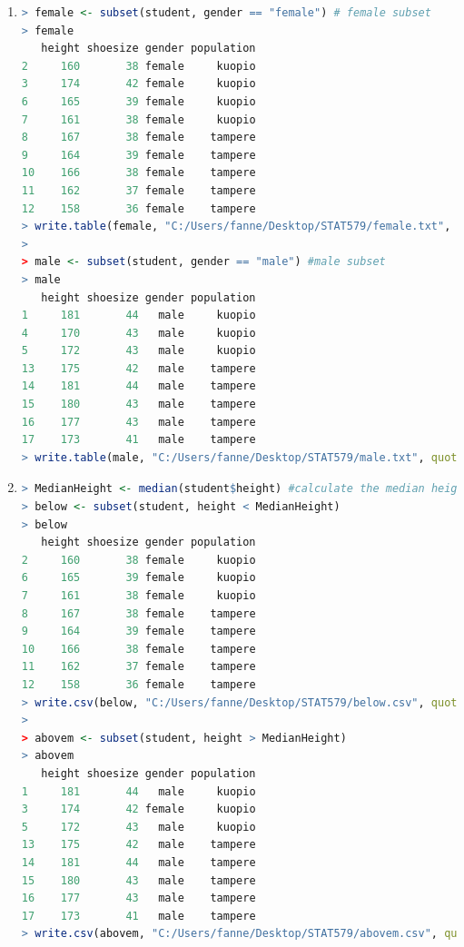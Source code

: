 \documentclass{article}
\begin{document}
\begin{enumerate}[leftmargin = 0 em, label = \arabic*., font = \bfseries]
\begin{enumerate}
\item
\begin{lstlisting}[language = R]
> female <- subset(student, gender == "female") # female subset
> female
   height shoesize gender population
2     160       38 female     kuopio
3     174       42 female     kuopio
6     165       39 female     kuopio
7     161       38 female     kuopio
8     167       38 female    tampere
9     164       39 female    tampere
10    166       38 female    tampere
11    162       37 female    tampere
12    158       36 female    tampere
> write.table(female, "C:/Users/fanne/Desktop/STAT579/female.txt", quote = F, row.names = F) # export to female.txt
> 
> male <- subset(student, gender == "male") #male subset
> male
   height shoesize gender population
1     181       44   male     kuopio
4     170       43   male     kuopio
5     172       43   male     kuopio
13    175       42   male    tampere
14    181       44   male    tampere
15    180       43   male    tampere
16    177       43   male    tampere
17    173       41   male    tampere
> write.table(male, "C:/Users/fanne/Desktop/STAT579/male.txt", quote = F, row.names = F) # export to male.txt
\end{lstlisting}

\item
\begin{lstlisting}[language = R]
> MedianHeight <- median(student$height) #calculate the median height
> below <- subset(student, height < MedianHeight)
> below
   height shoesize gender population
2     160       38 female     kuopio
6     165       39 female     kuopio
7     161       38 female     kuopio
8     167       38 female    tampere
9     164       39 female    tampere
10    166       38 female    tampere
11    162       37 female    tampere
12    158       36 female    tampere
> write.csv(below, "C:/Users/fanne/Desktop/STAT579/below.csv", quote = F, row.names = F) # export to below.csv
> 
> abovem <- subset(student, height > MedianHeight)
> abovem
   height shoesize gender population
1     181       44   male     kuopio
3     174       42 female     kuopio
5     172       43   male     kuopio
13    175       42   male    tampere
14    181       44   male    tampere
15    180       43   male    tampere
16    177       43   male    tampere
17    173       41   male    tampere
> write.csv(abovem, "C:/Users/fanne/Desktop/STAT579/abovem.csv", quote = F, row.names = F) # export to abovem.csv
\end{lstlisting}

\end{enumerate}


\end{enumerate}
\end{document}
